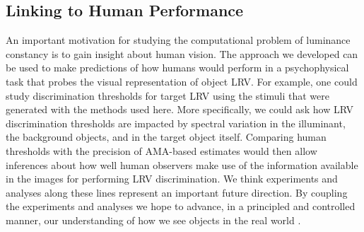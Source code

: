 \documentclass{jov}
\begin{document}
\subsection{Linking to Human Performance}

An important motivation for studying the computational problem of luminance constancy
is to gain insight about human vision.
The approach we developed can be used to make predictions of how humans would
perform in a psychophysical task that probes the visual representation of object LRV.
For example, one could study discrimination thresholds for target LRV using the
stimuli that were generated with the methods used here.
More specifically, we could ask how LRV discrimination thresholds are impacted by 
spectral variation in the illuminant, the background objects, and in the target object itself.
Comparing human thresholds with the precision of AMA-based estimates would then
allow inferences about how well human observers make use of the information available
in the images for performing LRV discrimination.
We think experiments and analyses along these lines represent an important future direction.
By coupling the experiments and analyses we hope to advance, in a principled and controlled manner,
our understanding of how we see objects in the real world .



\end{document}
